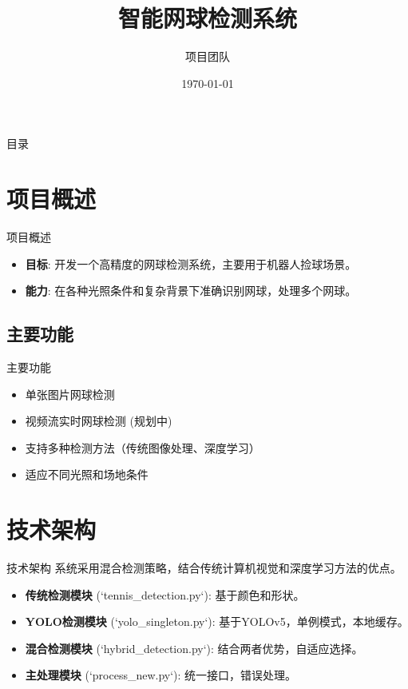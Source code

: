 \documentclass{beamer}
\title{智能网球检测系统}
\author{项目团队}
\date{\today}
\begin{document}
\begin{frame}
  \titlepage
\end{frame}

\begin{frame}{目录}
  \tableofcontents
\end{frame}

\section{项目概述}
\begin{frame}{项目概述}
  \begin{itemize}
    \item \textbf{目标}: 开发一个高精度的网球检测系统，主要用于机器人捡球场景。
    \item \textbf{能力}: 在各种光照条件和复杂背景下准确识别网球，处理多个网球。
  \end{itemize}
\end{frame}

\subsection{主要功能}
\begin{frame}{主要功能}
  \begin{itemize}
    \item 单张图片网球检测
    \item 视频流实时网球检测 (规划中)
    \item 支持多种检测方法（传统图像处理、深度学习）
    \item 适应不同光照和场地条件
  \end{itemize}
\end{frame}

\section{技术架构}
\begin{frame}{技术架构}
  系统采用混合检测策略，结合传统计算机视觉和深度学习方法的优点。
  \begin{itemize}
    \item \textbf{传统检测模块} (`tennis_detection.py`): 基于颜色和形状。
    \item \textbf{YOLO检测模块} (`yolo_singleton.py`): 基于YOLOv5，单例模式，本地缓存。
    \item \textbf{混合检测模块} (`hybrid_detection.py`): 结合两者优势，自适应选择。
    \item \textbf{主处理模块} (`process_new.py`): 统一接口，错误处理。
  \end{itemize}
\end{frame}
\end{document}
